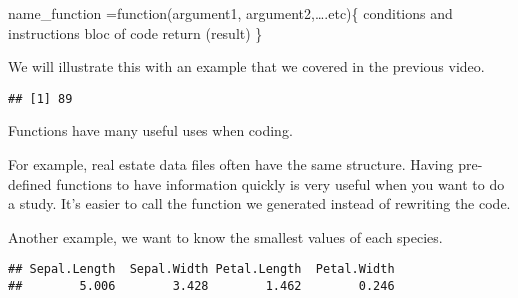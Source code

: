 \documentclass[
]{article}
\newenvironment{Shaded}{\begin{snugshade}}{\end{snugshade}}
\newcommand{\ControlFlowTok}[1]{\textcolor[rgb]{0.13,0.29,0.53}{\textbf{#1}}}
\newcommand{\DecValTok}[1]{\textcolor[rgb]{0.00,0.00,0.81}{#1}}
\newcommand{\FunctionTok}[1]{\textcolor[rgb]{0.13,0.29,0.53}{\textbf{#1}}}
\newcommand{\NormalTok}[1]{#1}
\newcommand{\OtherTok}[1]{\textcolor[rgb]{0.56,0.35,0.01}{#1}}
\newcommand{\SpecialCharTok}[1]{\textcolor[rgb]{0.81,0.36,0.00}{\textbf{#1}}}
\newcommand{\StringTok}[1]{\textcolor[rgb]{0.31,0.60,0.02}{#1}}
\begin{document}
name\_function =function(argument1, argument2,\ldots.etc)\{ conditions
and instructions bloc of code return (result) \}

We will illustrate this with an example that we covered in the previous
video.

\begin{Shaded}
\end{Shaded}

\begin{verbatim}
## [1] 89
\end{verbatim}

Functions have many useful uses when coding.

For example, real estate data files often have the same structure.
Having pre-defined functions to have information quickly is very useful
when you want to do a study. It's easier to call the function we
generated instead of rewriting the code.

Another example, we want to know the smallest values of each species.

\begin{Shaded}
\end{Shaded}

\begin{verbatim}
## Sepal.Length  Sepal.Width Petal.Length  Petal.Width 
##        5.006        3.428        1.462        0.246
\end{verbatim}
\end{document}
